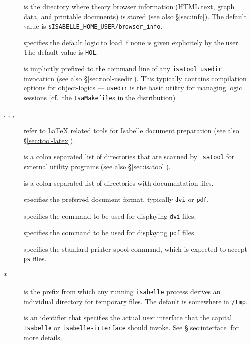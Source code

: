 \begin{description}
\item[] is the directory where theory browser
  information (HTML text, graph data, and printable documents) is stored (see
  also \S\ref{sec:info}).  The default value is
  \texttt{\$ISABELLE_HOME_USER/browser_info}.
  
\item[] specifies the default logic to load if none is
  given explicitely by the user.  The default value is \texttt{HOL}.
  
\item[] is implicitly prefixed to the command
  line of any \texttt{isatool usedir} invocation (see also
  \S\ref{sec:tool-usedir}). This typically contains compilation options for
  object-logics --- \texttt{usedir} is the basic utility for managing logic
  sessions (cf.\ the \texttt{IsaMakefile}s in the distribution).
  
\item[, ,
  , ] refer to {\LaTeX} related
  tools for Isabelle document preparation (see also \S\ref{sec:tool-latex}).
  
\item[] is a colon separated list of directories that
  are scanned by \texttt{isatool} for external utility programs (see also
  \S\ref{sec:isatool}).
  
\item[] is a colon separated list of directories with
  documentation files.
  
\item[] specifies the preferred document format,
  typically \texttt{dvi} or \texttt{pdf}.
  
\item[] specifies the command to be used for displaying
  \texttt{dvi} files.
  
\item[] specifies the command to be used for displaying
  \texttt{pdf} files.
  
\item[] specifies the standard printer spool command,
  which is expected to accept \texttt{ps} files.
  
\item[*] is the prefix from which any running
  \texttt{isabelle} process derives an individual directory for temporary
  files.  The default is somewhere in \texttt{/tmp}.
  
\item[] is an identifier that specifies the actual
  user interface that the capital \texttt{Isabelle} or
  \texttt{isabelle-interface} should invoke.  See \S\ref{sec:interface} for
  more details.

\end{description}


